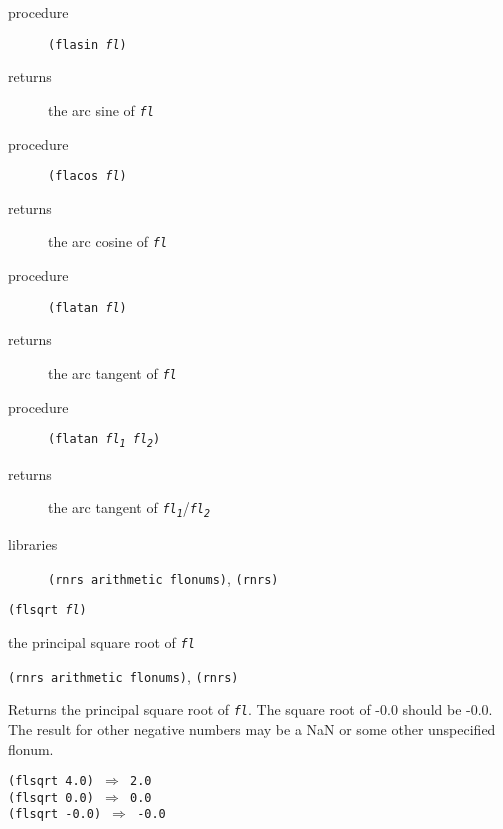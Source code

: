 \begin{description}

\label{objects_s195}\item[procedure] \texttt{(flasin \textit{fl})}



\item[returns] the arc sine of \texttt{\textit{fl}}


\item[procedure] \texttt{(flacos \textit{fl})}



\item[returns] the arc cosine of \texttt{\textit{fl}}


\item[procedure] \texttt{(flatan \textit{fl})}



\item[returns] the arc tangent of \texttt{\textit{fl}}


\item[procedure] \texttt{(flatan \textit{fl\textsubscript{1}} \textit{fl\textsubscript{2}})}



\item[returns] the arc tangent of \texttt{\textit{fl\textsubscript{1}}}/\texttt{\textit{fl\textsubscript{2}}}


\item[libraries] \texttt{(rnrs arithmetic flonums)}, \texttt{(rnrs)}
\end{description}

\begin{description}

\label{objects_s196}\item[procedure] \texttt{(flsqrt \textit{fl})}



\item[returns] the principal square root of \texttt{\textit{fl}}


\item[libraries] \texttt{(rnrs arithmetic flonums)}, \texttt{(rnrs)}
\end{description}


Returns the principal square root of \texttt{\textit{fl}}.
The square root of -0.0 should be -0.0.
The result for other negative numbers may be a NaN or some
other unspecified flonum.


\begin{alltt}
(flsqrt 4.0) \(\Rightarrow\) 2.0
(flsqrt 0.0) \(\Rightarrow\) 0.0
(flsqrt -0.0) \(\Rightarrow\) -0.0
\end{alltt}

